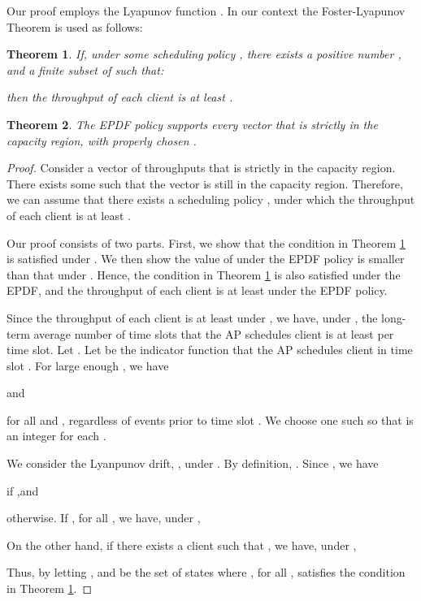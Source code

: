 \documentclass[10pt,nocopyrightspace]{sigplan-proc-varsize-1in}
\newtheorem{theorem}{Theorem}
\begin{document}
Our proof employs the Lyapunov function . In our context the Foster-Lyapunov Theorem is used as follows:

\begin{theorem}\label{theorem:scheduling:lyapunov}
If, under some scheduling policy , there exists a positive number , and a finite subset  of  such that:

then the throughput of each client  is at least .
\end{theorem}

\begin{theorem} \label{theorem:scheduling:optimal}
The EPDF policy supports every vector  that is strictly in the capacity region, with properly chosen .
\end{theorem}
\begin{proof}
Consider a vector of throughputs  that is strictly in the capacity region. There exists some  such that the vector  is still in the capacity region. Therefore, we can assume that there exists a scheduling policy , under which the throughput of each client  is at least .

Our proof consists of two parts. First, we show that the condition in Theorem \ref{theorem:scheduling:lyapunov} is satisfied under . We then show the value of  under the EPDF policy is smaller than that under . Hence, the condition in Theorem \ref{theorem:scheduling:lyapunov} is also satisfied under the EPDF, and the throughput of each client  is at least  under the EPDF policy.

Since the throughput of each client  is at least  under , we have, under , the long-term average number of time slots that the AP schedules client  is at least  per time slot. Let . Let  be the indicator function that the AP schedules client  in time slot . For large enough , we have

and

for all  and , regardless of events prior to time slot . We choose one such  so that  is an integer for each .

We consider the Lyanpunov drift, , under . By definition, . Since , we have

if ,and

otherwise. If , for all , we have, under ,

On the other hand, if there exists a client  such that , we have, under ,

Thus, by letting , and  be the set of states where , for all ,  satisfies the condition in Theorem \ref{theorem:scheduling:lyapunov}.


\end{proof}
\end{document}
